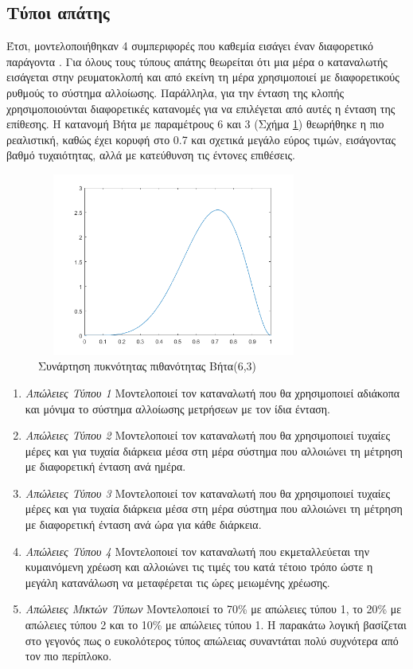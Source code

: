 \subsection{Τύποι απάτης}
Έτσι, μοντελοποιήθηκαν 4 συμπεριφορές που καθεμία εισάγει έναν διαφορετικό παράγοντα \cite{conspatterns}. Για όλους τους τύπους απάτης θεωρείται ότι μια μέρα ο καταναλωτής εισάγεται στην ρευματοκλοπή και από εκείνη τη μέρα χρησιμοποιεί με διαφορετικούς ρυθμούς το σύστημα αλλοίωσης. Παράλληλα, για την ένταση της κλοπής χρησιμοποιούνται διαφορετικές κατανομές για να επιλέγεται από αυτές η ένταση της επίθεσης. Η κατανομή Βήτα με παραμέτρους 6 και 3 (Σχήμα \ref{beta63}) θεωρήθηκε η πιο ρεαλιστική, καθώς έχει κορυφή στο 0.7 και σχετικά μεγάλο εύρος τιμών, εισάγοντας βαθμό τυχαιότητας, αλλά με κατεύθυνση τις έντονες επιθέσεις.\par
\begin{figure}[ht!]
\centering
\includegraphics[width=90mm, height=60mm]{../../plots/Consumption_Analysis/beta_6_3.png}
\caption{Συνάρτηση πυκνότητας πιθανότητας Βήτα(6,3) \label{beta63}}
\end{figure}
\begin{enumerate}
\item \textit{Απώλειες Τύπου 1} Μοντελοποιεί τον καταναλωτή που θα χρησιμοποιεί αδιάκοπα και μόνιμα το σύστημα αλλοίωσης μετρήσεων με τον ίδια ένταση.
\item \textit{Απώλειες Τύπου 2} Μοντελοποιεί τον καταναλωτή που θα χρησιμοποιεί τυχαίες μέρες και για τυχαία διάρκεια μέσα στη μέρα σύστημα που αλλοιώνει τη μέτρηση με διαφορετική ένταση ανά ημέρα.
\item \textit{Απώλειες Τύπου 3} Μοντελοποιεί τον καταναλωτή που θα χρησιμοποιεί τυχαίες μέρες και για τυχαία διάρκεια μέσα στη μέρα σύστημα που αλλοιώνει τη μέτρηση με διαφορετική ένταση ανά ώρα για κάθε διάρκεια.
\item \textit{Απώλειες Τύπου 4} Μοντελοποιεί τον καταναλωτή που εκμεταλλεύεται την κυμαινόμενη χρέωση και αλλοιώνει τις τιμές του κατά τέτοιο τρόπο ώστε η μεγάλη κατανάλωση να μεταφέρεται τις ώρες μειωμένης χρέωσης.
\item \textit{Απώλειες Μικτών Τύπων} Μοντελοποιεί το 70\% με απώλειες τύπου 1, το 20\% με απώλειες τύπου 2 και το 10\% με απώλειες τύπου 1. Η παρακάτω λογική βασίζεται στο γεγονός πως ο ευκολότερος τύπος απώλειας συναντάται πολύ συχνότερα από τον πιο περίπλοκο. 
\end{enumerate}

